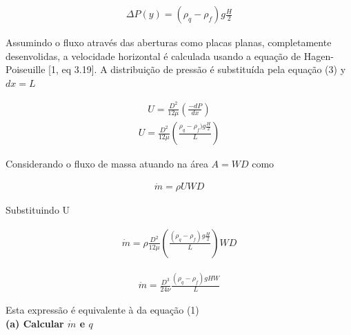 \documentclass[12pt]{article}
\begin{document}
\begin{equation}
	\begin{aligned}
		\Delta P(y) = ( \rho _{q} - \rho _{f})g\frac{H}{2}
	\end{aligned}
\end{equation}

Assumindo o fluxo através das aberturas como placas planas, completamente desenvolidas, a velocidade horizontal é calculada usando a equação de Hagen-Poiseuille [1, eq 3.19]. A distribuição de pressão é substituída pela equação (3) y $dx = L$


\begin{equation}
	\begin{aligned}
		U = \frac{D^{2}}{12\mu} \left( \frac{-dP}{dx}\right) 
	\end{aligned}
\end{equation}
\begin{equation}
	\begin{aligned}
		U = \frac{D^{2}}{12\mu} \left( \frac{\rho _{q} - \rho _{f})g\frac{H}{2}}{L}\right) 
	\end{aligned}
\end{equation}

Considerando o fluxo de massa atuando na área $A = WD$ como

\begin{equation}
	\begin{aligned}
		\dot{m} = \rho U WD
	\end{aligned}
\end{equation}

Substituindo U

\begin{equation}
	\begin{aligned}
		\dot{m} = \rho \frac{D^{2}}{12\mu} \left( \frac{(\rho _{q} - \rho _{f})g\frac{H}{2}}{L}\right)  WD
	\end{aligned}
\end{equation}

\begin{equation}
	\begin{aligned}
		\dot{m} = \frac{D^{3}}{24\nu} \frac{(\rho _{q} - \rho _{f})gHW}{L}
	\end{aligned}
\end{equation}

Esta expressão é equivalente à da equação (1)\\

\textbf{(a) Calcular $\dot{m}$ e $q$}\\
\end{document}
